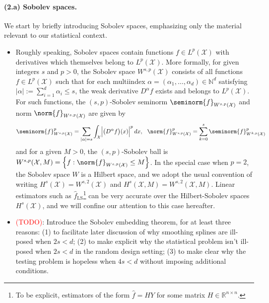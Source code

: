 \documentclass{article}
\newcommand{\Reals}{\mathbb{R}}
\newcommand{\abs}[1]{\left \lvert #1 \right \rvert}
\newcommand{\set}[1]{\left\{#1\right\}}
\newcommand{\1}{\mathbf{1}}
\newcommand{\Xset}{\mathcal{X}}
\newcommand{\Leb}{L}
\newcommand{\wh}[1]{\widehat{#1}}
\newcommand{\LS}{\mathrm{LS}}
\theoremstyle{alden}
\theoremstyle{aldenthm}
\theoremstyle{definition}
\theoremstyle{remark}
\begin{document}
\paragraph{(2.a) Sobolev spaces.} We start by briefly introducing Sobolev spaces, emphasizing only the material relevant to our statistical context. 
\begin{itemize}
	\item Roughly speaking, Sobolev spaces contain functions $f \in \Leb^p(\Xset)$ with derivatives which themselves belong to $\Leb^p(\Xset)$. More formally, for given integers $s$ and $p > 0$, the Sobolev space $W^{s,p}(\Xset)$ consists of all functions $f \in \Leb^p(\Xset)$ such that for each multiindex $\alpha = (\alpha_1,\ldots,\alpha_d) \in \mathbb{N}^d$ satisfying $\abs{\alpha} := \sum_{i = 1}^{d} \alpha_i \leq s$, the weak derivative $D^{\alpha}f$ exists and belongs to $\Leb^p(\Xset)$. For such functions, the $(s,p)$-Sobolev seminorm $\seminorm{f}_{W^{s,p}(\Xset)}$ and norm $\norm{f}_{W^{s,p}(\Xset)}$ are given by 
	\begin{equation*}
	\seminorm{f}_{W^{s,p}(\Xset)}^p = \sum_{\abs{\alpha} = s}\int_{\mathcal{X}} \Bigl|\bigl(D^{\alpha}f\bigr)(x)\Bigr|^p \,dx, ~~ \norm{f}_{W^{s,p}(\Xset)}^p = \sum_{k = 0}^{s} \seminorm{f}_{W^{k,p}(\Xset)}^p
	\end{equation*}
	and for a given $M > 0$, the $(s,p)$-Sobolev ball is $W^{s,p}(\Xset, M) = \set{f: \norm{f}_{W^{s,p}(\Xset)} \leq M}$. In the special case when $p = 2$, the Sobolev space $W$ is a Hilbert space, and we adopt the usual convention of writing $H^s(\Xset) = W^{s,2}(\Xset)$ and $H^s(\Xset,M) = W^{s,2}(\Xset,M)$. Linear estimators such as $\wh{f}_{\LS}$\footnote{To be explicit, estimators of the form $\wh{f} = HY$ for some matrix $H \in \Reals^{n \times n}$.} can be very accurate over the Hilbert-Sobolev spaces $H^s(\Xset)$, and we will confine our attention to this case hereafter.
	\item \textcolor{red}{(TODO)}: Introduce the Sobolev embedding theorem, for at least three reasons: (1) to facilitate later discussion of why smoothing splines are ill-posed when $2s < d$; (2) to make explicit why the statistical problem isn't ill-posed when $2s < d$ in the random design setting; (3) to make clear why the testing problem is hopeless when $4s < d$ without imposing additional conditions.
\end{itemize}
\end{document}
